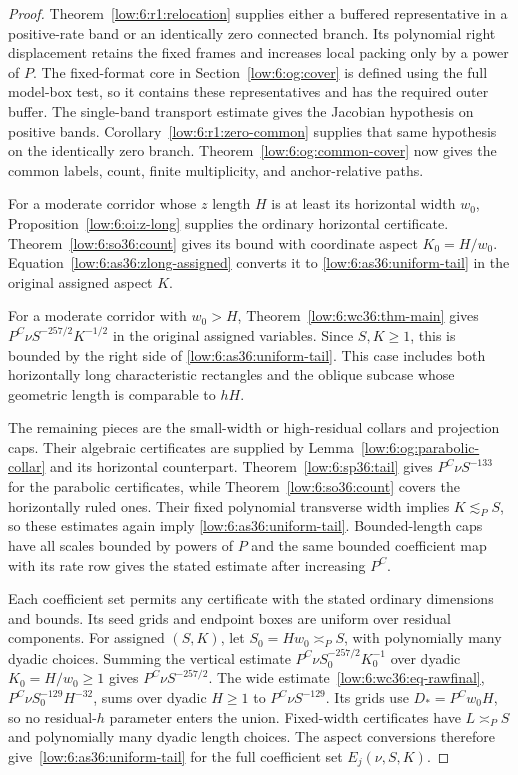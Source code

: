 \documentclass[11pt]{amsart}
\theoremstyle{definition}
\theoremstyle{remark}
\numberwithin{equation}{section}
\begin{document}
\begin{proof}
Theorem~\ref{low:6:r1:relocation} supplies either a buffered representative in a positive-rate band or an identically zero connected branch. Its polynomial right displacement retains the fixed frames and increases local packing only by a power of $P$. The fixed-format core in Section~\ref{low:6:og:cover} is defined using the full model-box test, so it contains these representatives and has the required outer buffer. The single-band transport estimate gives the Jacobian hypothesis on positive bands. Corollary~\ref{low:6:r1:zero-common} supplies that same hypothesis on the identically zero branch. Theorem~\ref{low:6:og:common-cover} now gives the common labels, count, finite multiplicity, and anchor-relative paths.

For a moderate corridor whose $z$ length $H$ is at least its horizontal width $w_0$, Proposition~\ref{low:6:oi:z-long} supplies the ordinary horizontal certificate. Theorem~\ref{low:6:so36:count} gives its bound with coordinate aspect $K_0=H/w_0$. Equation~\eqref{low:6:as36:zlong-assigned} converts it to \eqref{low:6:as36:uniform-tail} in the original assigned aspect $K$.

For a moderate corridor with $w_0>H$, Theorem~\ref{low:6:wc36:thm-main} gives $P^C\nu S^{-257/2}K^{-1/2}$ in the original assigned variables. Since $S,K\ge1$, this is bounded by the right side of \eqref{low:6:as36:uniform-tail}. This case includes both horizontally long characteristic rectangles and the oblique subcase whose geometric length is comparable to $hH$.

The remaining pieces are the small-width or high-residual collars and projection caps. Their algebraic certificates are supplied by Lemma~\ref{low:6:og:parabolic-collar} and its horizontal counterpart. Theorem~\ref{low:6:sp36:tail} gives $P^C\nu S^{-133}$ for the parabolic certificates, while Theorem~\ref{low:6:so36:count} covers the horizontally ruled ones. Their fixed polynomial transverse width implies $K\lesssim_PS$, so these estimates again imply \eqref{low:6:as36:uniform-tail}. Bounded-length caps have all scales bounded by powers of $P$ and the same bounded coefficient map with its rate row gives the stated estimate after increasing $P^C$.

Each coefficient set permits any certificate with the stated ordinary dimensions and bounds. Its seed grids and endpoint boxes are uniform over residual components. For assigned $(S,K)$, let $S_0=Hw_0\asymp_PS$, with polynomially many dyadic choices. Summing the vertical estimate $P^C\nu S_0^{-257/2}K_0^{-1}$ over dyadic $K_0=H/w_0\ge1$ gives $P^C\nu S^{-257/2}$. The wide estimate~\eqref{low:6:wc36:eq-rawfinal}, $P^C\nu S_0^{-129}H^{-32}$, sums over dyadic $H\ge1$ to $P^C\nu S^{-129}$. Its grids use $D_*=P^Cw_0H$, so no residual-$h$ parameter enters the union. Fixed-width certificates have $L\asymp_PS$ and polynomially many dyadic length choices. The aspect conversions therefore give~\eqref{low:6:as36:uniform-tail} for the full coefficient set $E_j(\nu,S,K)$.


\end{proof}
\end{document}
